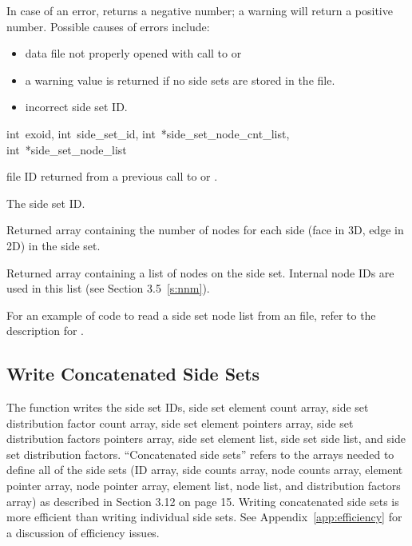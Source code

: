 In case of an error,  returns a
negative number; a warning will return a positive number.  Possible
causes of errors include:

\begin{itemize}
 \item data file not properly opened with call to 
 or 

 \item a warning value is returned if no side sets are stored in the
 file.

 \item incorrect side set ID.
\end{itemize}


{int~exoid, 
int~side_set_id, 
int~*side_set_node_cnt_list, 
int~*side_set_node_list}

\begin{parameters}
\item[{int exoid \R{}}]
\exo{} file ID returned from a previous call to  
or .

\item[{int side_set_id \R{}}]
The side set ID.

\item[{int* side_set_node_cnt_list \W{}}]
Returned array containing the number of nodes for each side (face in
3D, edge in 2D) in the side set.

\item[{int* side_set_node_list \W{}}]
Returned array containing a list of nodes on the side set. Internal
node IDs are used in this list (see Section 3.5~\ref{s:nnm}).
\end{parameters}

For an example of code to read a side set node list from an \exo{}
file, refer to the description for .




\subsection{Write Concatenated Side Sets}

The function  writes the side set
IDs, side set element count array, side set distribution factor count
array, side set element pointers array, side set distribution factors
pointers array, side set element list, side set side list, and side
set distribution factors. ``Concatenated side sets'' refers to the
arrays needed to define all of the side sets (ID array, side counts
array, node counts array, element pointer array, node pointer array,
element list, node list, and distribution factors array) as described
in Section 3.12 on page 15. Writing concatenated side sets is more
efficient than writing individual side sets. See
Appendix~\ref{app:efficiency} for a discussion of efficiency issues.

